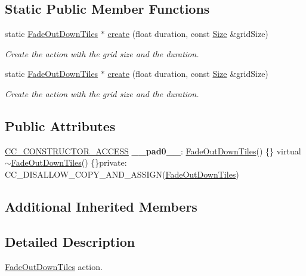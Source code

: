 \subsection*{Static Public Member Functions}
\begin{DoxyCompactItemize}
\item 
static \hyperlink{classFadeOutDownTiles}{Fade\+Out\+Down\+Tiles} $\ast$ \hyperlink{classFadeOutDownTiles_a7f7b443a477d977fdcc2e02e6072469e}{create} (float duration, const \hyperlink{classSize}{Size} \&grid\+Size)
\begin{DoxyCompactList}\small\item\em Create the action with the grid size and the duration. \end{DoxyCompactList}\item 
static \hyperlink{classFadeOutDownTiles}{Fade\+Out\+Down\+Tiles} $\ast$ \hyperlink{classFadeOutDownTiles_abe294541edb005596c7a9703e3cf5517}{create} (float duration, const \hyperlink{classSize}{Size} \&grid\+Size)
\begin{DoxyCompactList}\small\item\em Create the action with the grid size and the duration. \end{DoxyCompactList}\end{DoxyCompactItemize}
\subsection*{Public Attributes}
\begin{DoxyCompactItemize}
\item 
\mbox{\label{classFadeOutDownTiles_ab5d3c7ef92487df0a127261d12e1608e}} 
\hyperlink{_2cocos2d_2cocos_2base_2ccConfig_8h_a25ef1314f97c35a2ed3d029b0ead6da0}{C\+C\+\_\+\+C\+O\+N\+S\+T\+R\+U\+C\+T\+O\+R\+\_\+\+A\+C\+C\+E\+SS} {\bfseries \+\_\+\+\_\+pad0\+\_\+\+\_\+}\+: \hyperlink{classFadeOutDownTiles}{Fade\+Out\+Down\+Tiles}() \{\} virtual $\sim$\hyperlink{classFadeOutDownTiles}{Fade\+Out\+Down\+Tiles}() \{\}private\+: C\+C\+\_\+\+D\+I\+S\+A\+L\+L\+O\+W\+\_\+\+C\+O\+P\+Y\+\_\+\+A\+N\+D\+\_\+\+A\+S\+S\+I\+GN(\hyperlink{classFadeOutDownTiles}{Fade\+Out\+Down\+Tiles})
\end{DoxyCompactItemize}
\subsection*{Additional Inherited Members}


\subsection{Detailed Description}
\hyperlink{classFadeOutDownTiles}{Fade\+Out\+Down\+Tiles} action. 


